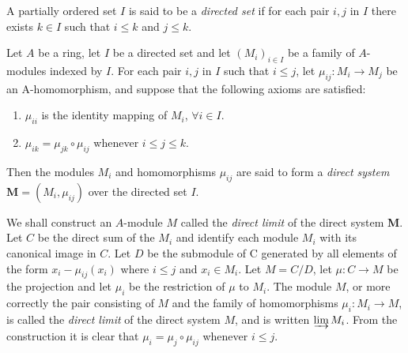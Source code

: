 \begin{ex}
	A partially ordered set $I$ is said to be a \textit{directed set} if for each pair $i, j$ in $I$ there exists $k \in I$ such that $i \leq k$ and $j\leq k$.

	Let $A$ be a ring, let $I$ be a directed set and let $(M_i)_{i \in I}$ be a family of $A$-modules indexed by $I$. For each pair $i, j$ in $I$ such that $i \leq j$, let $\mu_{ij}: M_i \to M_j$ be an A-homomorphism, and suppose that the following axioms are satisfied:
	\begin{enumerate}
		\item $\mu_{ii}$ is the identity mapping of $M_i$, $\forall i \in I$.
		\item $\mu_{ik} = \mu_{jk} \circ \mu_{ij}$ whenever $i \leq j \leq k$. 
	\end{enumerate}
	Then the modules $M_i$ and homomorphisms $\mu_{ij}$ are said to form a \textit{direct system} $\textbf{M} =(M_i, \mu_{ij})$ over the directed set $I$.

	We shall construct an $A$-module $M$ called the \textit{direct limit} of the direct system \textbf{M}. Let $C$ be the direct sum of the $M_i$ and identify each module $M_i$ with its canonical image in $C$. Let $D$ be the submodule of C generated by all elements of the form $x_i - \mu_{ij}(x_i)$ where $i\leq j$ and $x_i \in M_i$. Let $M = C/D$, let $\mu: C \to M$ be the projection and let $\mu_i$ be the restriction of $\mu$ to $M_i$. The module $M$, or more correctly the pair consisting of $M$ and the family of homomorphisms $\mu_i: M_i \to M$, is called the \textit{direct limit} of the direct system $M$, and is written $\varinjlim M_i$. From the construction it is clear that $\mu_i = \mu_j \circ \mu_{ij}$ whenever $i \leq j$.
\end{ex}


